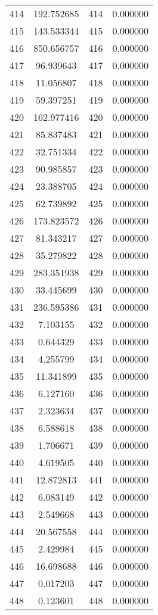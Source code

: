 \documentclass[12pt]{article}
\begin{document}
\begin{longtable}{@{}cccc@{}}
414 & 192.752685 & 414 & 0.000000 \\
415 & 143.533344 & 415 & 0.000000 \\
416 & 850.656757 & 416 & 0.000000 \\
417 & 96.939643 & 417 & 0.000000 \\
418 & 11.056807 & 418 & 0.000000 \\
419 & 59.397251 & 419 & 0.000000 \\
420 & 162.977416 & 420 & 0.000000 \\
421 & 85.837483 & 421 & 0.000000 \\
422 & 32.751334 & 422 & 0.000000 \\
423 & 90.985857 & 423 & 0.000000 \\
424 & 23.388705 & 424 & 0.000000 \\
425 & 62.739892 & 425 & 0.000000 \\
426 & 173.823572 & 426 & 0.000000 \\
427 & 81.343217 & 427 & 0.000000 \\
428 & 35.279822 & 428 & 0.000000 \\
429 & 283.351938 & 429 & 0.000000 \\
430 & 33.445699 & 430 & 0.000000 \\
431 & 236.595386 & 431 & 0.000000 \\
432 & 7.103155 & 432 & 0.000000 \\
433 & 0.644329 & 433 & 0.000000 \\
434 & 4.255799 & 434 & 0.000000 \\
435 & 11.341899 & 435 & 0.000000 \\
436 & 6.127160 & 436 & 0.000000 \\
437 & 2.323634 & 437 & 0.000000 \\
438 & 6.588618 & 438 & 0.000000 \\
439 & 1.706671 & 439 & 0.000000 \\
440 & 4.619505 & 440 & 0.000000 \\
441 & 12.872813 & 441 & 0.000000 \\
442 & 6.083149 & 442 & 0.000000 \\
443 & 2.549668 & 443 & 0.000000 \\
444 & 20.567558 & 444 & 0.000000 \\
445 & 2.429984 & 445 & 0.000000 \\
446 & 16.698688 & 446 & 0.000000 \\
447 & 0.017203 & 447 & 0.000000 \\
448 & 0.123601 & 448 & 0.000000 \\

\end{longtable}
\end{document}

